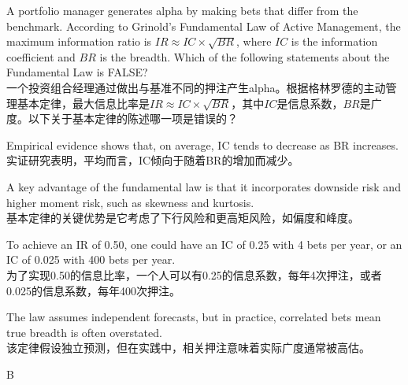 \documentclass{article}
\newcounter{question} %
\begin{document}
\begin{question}
    A portfolio manager generates alpha by making bets that differ from the benchmark. According to Grinold's Fundamental Law of Active Management, the maximum information ratio is $IR \approx IC \times \sqrt{BR}$, where $IC$ is the information coefficient and $BR$ is the breadth. Which of the following statements about the Fundamental Law is FALSE?\\
    一个投资组合经理通过做出与基准不同的押注产生alpha。根据格林罗德的主动管理基本定律，最大信息比率是$IR \approx IC \times \sqrt{BR}$，其中$IC$是信息系数，$BR$是广度。以下关于基本定律的陈述哪一项是错误的？
\end{question}

\begin{choices}
    \item Empirical evidence shows that, on average, IC tends to decrease as BR increases.\\
    实证研究表明，平均而言，IC倾向于随着BR的增加而减少。
    \item A key advantage of the fundamental law is that it incorporates downside risk and higher moment risk, such as skewness and kurtosis.\\
    基本定律的关键优势是它考虑了下行风险和更高矩风险，如偏度和峰度。
    \item To achieve an IR of 0.50, one could have an IC of 0.25 with 4 bets per year, or an IC of 0.025 with 400 bets per year.\\
    为了实现0.50的信息比率，一个人可以有0.25的信息系数，每年4次押注，或者0.025的信息系数，每年400次押注。
    \item The law assumes independent forecasts, but in practice, correlated bets mean true breadth is often overstated.\\
    该定律假设独立预测，但在实践中，相关押注意味着实际广度通常被高估。
\end{choices}

\begin{correctanswer}
    B
\end{correctanswer}
\end{document}
